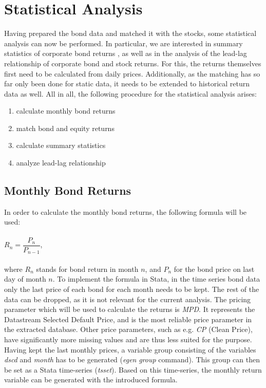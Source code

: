 \chapter{Statistical Analysis} \label{chapter:statistical-analysis}
Having prepared the bond data and matched it with the stocks, some statistical analysis can now be performed. In particular, we are interested in summary statistics of corporate bond returns \cite{q-factors}, as well as in the analysis of the lead-lag relationship of corporate bond and stock returns. For this, the returns themselves first need to be calculated from daily prices. Additionally, as the matching has so far only been done for static data, it needs to be extended to historical return data as well. All in all, the following procedure for the statistical analysis arises: 
\begin{enumerate}
	\item calculate monthly bond returns
	\item match bond and equity returns
	\item calculate summary statistics
	\item analyze lead-lag relationship
\end{enumerate}

\section{Monthly Bond Returns}
In order to calculate the monthly bond returns, the following formula will be used: \\ \\
$R_{n} = \dfrac{P_{n}}{P_{n-1}}$, \\ \\ where $R_{n}$ stands for bond return in month $n$, and $P_{n}$ for the bond price on last day of month $n$. 
To implement the formula in Stata, in the time series bond data only the last price of each bond for each month needs to be kept. The rest of the data can be dropped, as it is not relevant for the current analysis. The pricing parameter which will be used to calculate the returns is \textit{MPD}. It represents the Datastream Selected Default Price, and is the most reliable price parameter in the extracted database. Other price parameters, such as e.g. \textit{CP} (Clean Price), have significantly more missing values and are thus less suited for the purpose. Having kept the last monthly prices, a variable group consisting of the variables \textit{dscd} and \textit{month} has to be generated (\textit{egen} \textit{group} command). This group can then be set as a Stata time-series (\textit{tsset}). Based on this time-series, the monthly return variable can be generated with the introduced formula. 

